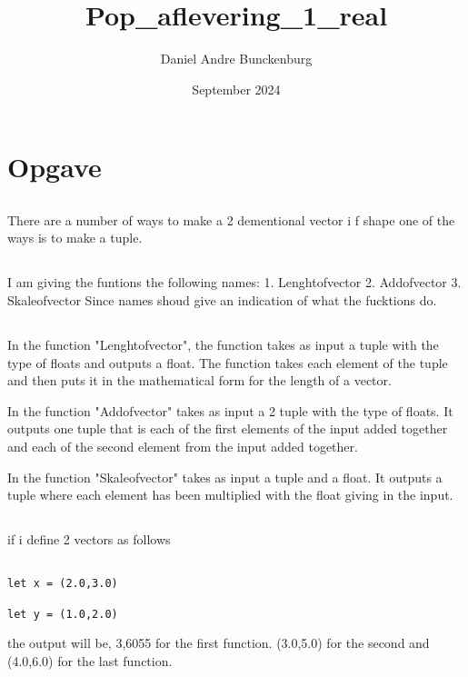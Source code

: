 \documentclass{article}
\title{Pop_aflevering_1_real}
\author{Daniel Andre Bunckenburg}
\date{September 2024}
\begin{document}
\section{Opgave}
\subsection{}

There are a number of ways to make a 2 dementional vector i f shape one of the ways is to make a tuple. 


\subsection{}
I am giving the funtions the following names:
1. Lenghtofvector
2. Addofvector
3. Skaleofvector
Since names shoud give an indication of what the fucktions do. 

\subsection{}


In the function "Lenghtofvector", the function takes as input a tuple with the type of floats and outputs a float. The function takes each element of the tuple and then puts it in the mathematical form for the length of a vector.

In the function "Addofvector" takes as input a 2 tuple with the type of floats. It outputs one tuple that is each of the first elements of the input added together and each of the second element from the input added together.


In the function "Skaleofvector" takes as input a tuple and a float. It outputs a tuple where each element has been multiplied with the float giving in the input.


\subsection{}

if i define 2 vectors as follows
    \begin{lstlisting}

let x = (2.0,3.0)

let y = (1.0,2.0)

    \end{lstlisting}

the output will be, 3,6055 for the first function. (3.0,5.0) for the second and (4.0,6.0) for the last function.
\end{document}
